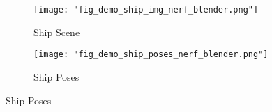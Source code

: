 \begin{figure}
    \centering
    \begin{subfigure}{0.48\linewidth}
        \texttt{[image: "fig\_demo\_ship\_img\_nerf\_blender.png"]}
        \caption{Ship Scene}
    \end{subfigure}
    \begin{subfigure}{0.48\linewidth}
        \texttt{[image: 
            "fig\_demo\_ship\_poses\_nerf\_blender.png"]}
        \caption{Ship Poses}
    \end{subfigure}
    \label{fig:dataset_nerf_blender_ship}
\end{figure}
